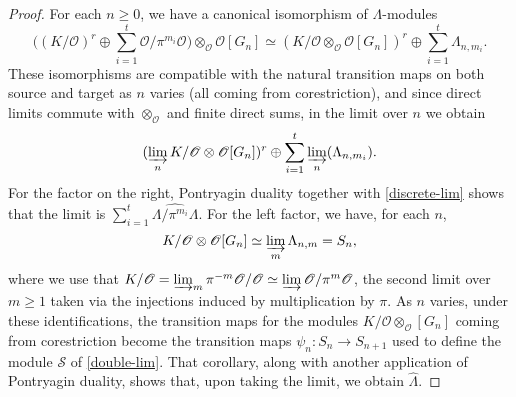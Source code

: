 \documentclass[12 pt]{amsart}
\theoremstyle{plain}
\theoremstyle{definition}
\numberwithin{equation}{section}
\numberwithin{table}{section}
\begin{document}
\begin{proof}
For each $n\geq 0$, we have a canonical isomorphism of $\Lambda$-modules
\begin{equation*}
\big((K/\mathscr{O})^r\oplus\sum_{i=1}^t\mathscr{O}/\pi^{m_i}\mathscr{O}\big)\otimes_\mathscr{O}\mathscr{O}[G_n]
\simeq(K/\mathscr{O}\otimes_\mathscr{O}\mathscr{O}[G_n])^r\oplus\sum_{i=1}^t\Lambda_{n,m_i}\text{.}
\end{equation*}
These isomorphisms are compatible with the natural transition maps on both source and target as $n$ varies (all coming from corestriction), and since direct limits commute with $\otimes_\mathscr{O}$ and finite direct sums, in the limit over $n$ we obtain
\begin{equation*}
(\varinjlim_n K/\mathscr{O}\otimes\mathscr{O}[G_n])^r\oplus\sum_{i=1}^t\varinjlim_n(\Lambda_{n,m_i})\text{.}
\end{equation*}
For the factor on the right, Pontryagin duality together with \cref{discrete-lim} shows that the limit is $\sum_{i=1}^t\widehat{\Lambda/\pi^{m_i}\Lambda}$. For the left factor, we have, for each $n$,
\begin{equation*}
K/\mathscr{O}\otimes\mathscr{O}[G_n]\simeq\varinjlim_m\Lambda_{n,m}=S_n\text{,}
\end{equation*}
where we use that $K/\mathscr{O}=\varinjlim_m\pi^{-m}\mathscr{O}/\mathscr{O}\simeq\varinjlim\mathscr{O}/\pi^m\mathscr{O}$, the second limit over $m\geq 1$ taken via the injections induced by multiplication by $\pi$. As $n$ varies, under these identifications, the transition maps for the modules $K/\mathscr{O}\otimes_\mathscr{O}[G_n]$ coming from corestriction become the transition maps $\psi_n:S_n\rightarrow S_{n+1}$ used to define the module $\mathscr{S}$ of \cref{double-lim}. That corollary, along with another application of Pontryagin duality, shows that, upon taking the limit, we obtain $\widehat{\Lambda}$.
\end{proof}
\end{document}
